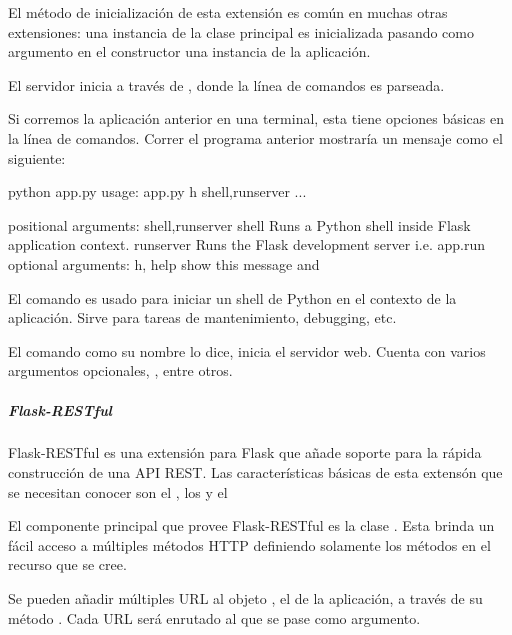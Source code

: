 El método de inicialización de esta extensión es común en muchas otras
extensiones: una instancia de la clase principal es inicializada pasando como
argumento en el constructor una instancia de la aplicación.

El servidor inicia a través de , donde la línea de comandos
es parseada.

Si corremos la aplicación anterior en una terminal, esta tiene opciones básicas
en la línea de comandos. Correr el programa anterior mostraría un mensaje como
el siguiente:

\begin{sphinxVerbatim}[commandchars=\\\{\}]
\PYGZdl{} python app.py
usage: app.py \PYG{o}{[}\PYGZhy{}h\PYG{o}{]} shell,runserver ...

positional arguments:
shell,runserver
  shell Runs a Python shell inside Flask application context.
  runserver Runs the Flask development server i.e. app.run
optional arguments:
  \PYGZhy{}h, \PYGZhy{}\PYGZhy{}help  show this  message and 
\end{sphinxVerbatim}

El comando  es usado para iniciar un shell de Python en el contexto
de la aplicación. Sirve para tareas de mantenimiento, debugging, etc.

El comando  como su nombre lo dice, inicia el servidor web. Cuenta
con varios argumentos opcionales, ,
entre otros.


\subparagraph{Flask-RESTful}
\label{\detokenize{chapter_two/desc_cloudnao:flask-restful}}
Flask-RESTful es una extensión para Flask que añade soporte para la rápida
construcción de una API REST. Las características básicas de esta extensón
que se necesitan conocer
son el , los  y el 

El componente principal que provee Flask-RESTful es la clase .
Esta brinda un fácil acceso a múltiples métodos HTTP definiendo
solamente los métodos en el recurso que se cree.

Se pueden añadir múltiples URL al objeto , el 
de la aplicación, a través de su método . Cada URL será
enrutado al  que se pase como argumento.

